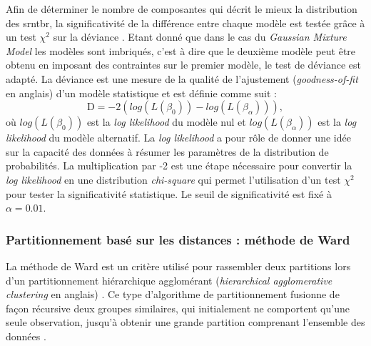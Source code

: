 Afin de déterminer le nombre de composantes qui décrit le mieux la distribution des \gls{srntbr}, la significativité de la différence entre chaque 
modèle est testée grâce à un test $\chi^2$ sur la déviance \citep[Chapitre~6]{James2013}. Etant donné que dans le cas du \textit{Gaussian Mixture Model} les modèles
sont imbriqués, c'est à dire que le deuxième modèle peut être obtenu en imposant des contraintes sur le premier modèle, le test de 
déviance est adapté. La déviance est une mesure de la qualité de l'ajustement (\textit{goodness-of-fit} 
en anglais) d'un modèle statistique et est définie comme suit :
\begin{equation}
\label{eq:tbr_deviance}
\text{D} = -2(log(L(\beta_{0})) - log(L(\beta_{\alpha}))),
\end{equation}
où $log(L(\beta_{0}))$ est la \textit{log likelihood} du modèle nul et $log(L(\beta_{\alpha}))$ est la \textit{log likelihood} du modèle alternatif. 
La \textit{log likelihood} a pour rôle de donner une idée sur la capacité des données à résumer les paramètres de la distribution de probabilités. 
La multiplication par -2 est une étape nécessaire pour convertir la \textit{log likelihood} en une distribution \textit{chi-square} qui permet 
l'utilisation d'un test $\chi^2$ pour tester la significativité statistique. Le seuil de significativité est fixé à $\alpha = 0.01$.

\subsubsection{Partitionnement basé sur les distances : méthode de Ward}
La méthode de Ward est un critère utilisé pour rassembler deux partitions lors d'un partitionnement hiérarchique agglomérant (\textit{hierarchical agglomerative clustering} 
en anglais) \citep{Ward1963}. Ce type d'algorithme de partitionnement fusionne de façon récursive deux groupes similaires, qui initialement ne comportent qu'une seule observation, jusqu'à obtenir une
grande partition comprenant l'ensemble des données \citep[Chapitre~10]{James2013}.

